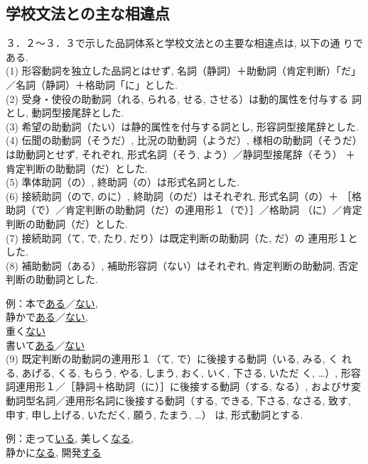 \subsection{学校文法との主な相違点}
 ３．２〜３．３で示した品詞体系と学校文法との主要な相違点は, 以下の通
 りである. \\
(1) 形容動詞を独立した品詞とはせず, 名詞（静詞）＋助動詞（肯定判断）「だ」
／名詞（静詞）＋格助詞「に」とした.\\
(2) 受身・使役の助動詞（れる, られる, せる, させる）は動的属性を付与する
詞とし, 動詞型接尾辞とした.\\
(3) 希望の助動詞（たい）は静的属性を付与する詞とし, 形容詞型接尾辞とした. \\
(4) 伝聞の助動詞（そうだ）, 比況の助動詞（ようだ）, 様相の助動詞（そうだ）
は助動詞とせず, それぞれ, 形式名詞（そう, よう）／静詞型接尾辞（そう）
＋肯定判断の助動詞（だ）とした.\\
(5) 準体助詞（の）, 終助詞（の）は形式名詞とした. \\
(6) 接続助詞（ので, のに）, 終助詞（のだ）はそれぞれ, 形式名詞（の）＋
［格助詞（で）／肯定判断の助動詞（だ）の連用形１（で）］／格助詞
（に）／肯定判断の助動詞（だ）とした.\\
(7) 接続助詞（て, で, たり, だり）は既定判断の助動詞（た, だ）の
連用形１とした. \\
(8) 補助動詞（ある）, 補助形容詞（ない）はそれぞれ, 肯定判断の助動詞, 
否定判断の助動詞とした.

 例：本で\underline{ある}／\underline{ない}, \\
 \hspace*{12mm}静かで\underline{ある}／\underline{ない}, \\
 \hspace*{12mm}重く\underline{ない}\\
 \hspace*{12mm}書いて\underline{ある}／\underline{ない}\\
(9) 既定判断の助動詞の連用形１（て, で）に後接する動詞（いる, みる, く
れる, あげる, くる, もらう, やる, しまう, おく, いく, 下さる, いただ
く, …）, 形容詞連用形１／［静詞＋格助詞（に）］に後接する動詞（する, 
なる）, およびサ変動詞型名詞／連用形名詞に後接する動詞（する, できる, 
下さる, なさる, 致す, 申す, 申し上げる, いただく, 願う, たまう, …）
は, 形式動詞とする.

 例：走って\underline{いる}, 美しく\underline{なる}, \\
 \hspace*{12mm}静かに\underline{なる}, 開発\underline{する}

